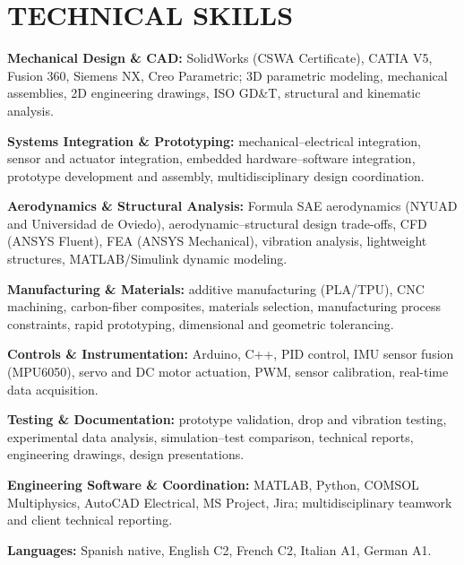 \section*{TECHNICAL SKILLS}
{\small
\textbf{Mechanical Design \& CAD:} SolidWorks (CSWA Certificate), CATIA V5, Fusion 360, Siemens NX, Creo Parametric; 3D parametric modeling, mechanical assemblies, 2D engineering drawings, ISO GD\&T, structural and kinematic analysis.

\vspace{1pt}
\textbf{Systems Integration \& Prototyping:} mechanical--electrical integration, sensor and actuator integration, embedded hardware--software integration, prototype development and assembly, multidisciplinary design coordination.

\vspace{1pt}
\textbf{Aerodynamics \& Structural Analysis:} Formula SAE aerodynamics (NYUAD and Universidad de Oviedo), aerodynamic--structural design trade-offs, CFD (ANSYS Fluent), FEA (ANSYS Mechanical), vibration analysis, lightweight structures, MATLAB/Simulink dynamic modeling.

\vspace{1pt}
\textbf{Manufacturing \& Materials:} additive manufacturing (PLA/TPU), CNC machining, carbon-fiber composites, materials selection, manufacturing process constraints, rapid prototyping, dimensional and geometric tolerancing.

\vspace{1pt}
\textbf{Controls \& Instrumentation:} Arduino, C++, PID control, IMU sensor fusion (MPU6050), servo and DC motor actuation, PWM, sensor calibration, real-time data acquisition.

\vspace{1pt}
\textbf{Testing \& Documentation:} prototype validation, drop and vibration testing, experimental data analysis, simulation--test comparison, technical reports, engineering drawings, design presentations.

\vspace{1pt}
\textbf{Engineering Software \& Coordination:} MATLAB, Python, COMSOL Multiphysics, AutoCAD Electrical, MS Project, Jira; multidisciplinary teamwork and client technical reporting.

\vspace{1pt}
\textbf{Languages:} Spanish native, English C2, French C2, Italian A1, German A1.
}